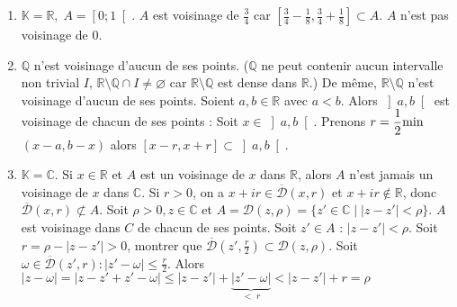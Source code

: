 \documentclass[12pt,a4paper]{report}
\begin{document}
\begin{exemple}[Exemples]
\begin{enumerate}
\item $\mathbb{K}=\mathbb{R},\; A = \left[0;1\right[$. $A$ est voisinage de $\frac{3}{4}$ car $\left[\frac{3}{4} - \frac{1}{8}, \frac{3}{4} + \frac{1}{8} \right] \subset A$.
\newline $A$ n'est pas voisinage de $0$.
\item $\mathbb{Q}$ n'est voisinage d'aucun de ses points.
\newline ($\mathbb{Q}$ ne peut contenir aucun intervalle non trivial $I$, $\mathbb{R} \setminus \mathbb{Q} \cap I \neq \varnothing$ car $\mathbb{R} \setminus \mathbb{Q}$ est dense dans $\mathbb{R}$.)
\newline De même, $\mathbb{R} \setminus \mathbb{Q}$ n'est voisinage d'aucun de ses points.
\newline Soient $a,b \in \mathbb{R}$ avec $a<b$. Alors $\left]a,b\right[$ est voisinage de chacun de ses points :
\newline Soit $x \in \left]a,b\right[$. Prenons $r = \dfrac{1}{2}\rm{min}$$(x-a,b-x)$ alors $\left[x-r,x+r\right] \subset \left]a,b\right[$.
\item $\mathbb{K}=\mathbb{C}.$ Si $x \in \mathbb{R}$ et $A$ est un voisinage de $x$ dans $\mathbb{R}$, alors $A$ n'est jamais un voisinage de $x$ dans $\mathbb{C}$.
\newline Si $r>0$, on a $x+ir \in \overline{\mathcal{D}}(x,r)$ et $x+ir \not \in \mathbb{R}$, donc $\overline{\mathcal{D}}(x,r) \not \subset A$.
\newline Soit $\rho > 0, z \in \mathbb{C}$ et $A = \mathcal{D}(z,\rho) = \{ z' \in \mathbb{C} \mid \lvert z-z' \rvert < \rho \}$.
\newline $A$ est voisinage dans $C$ de chacun de ses points. Soit $z' \in A$ : $\lvert  z-z' \rvert < \rho$.
\newline Soit $r = \rho - \lvert z-z' \rvert > 0$, montrer que $\overline{\mathcal{D}}(z',\frac{r}{2}) \subset \mathcal{D}(z,\rho)$.
\newline Soit $\omega \in \overline{\mathcal{D}}(z',r) : \lvert z'-\omega \rvert \leq \frac{r}{2}$. Alors $\lvert z-\omega \rvert = \lvert z-z'+z'-\omega \rvert \leq \lvert z-z' \rvert + \underbrace{\lvert z'-\omega \rvert}_{<\; r} < \lvert z-z' \rvert + r = \rho$
\end{enumerate}
\end{exemple}

\pagebreak
\end{document}
